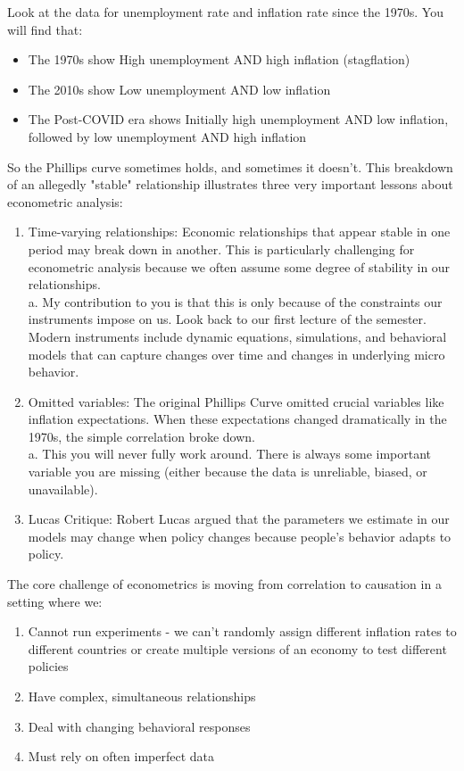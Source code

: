 \documentclass[10pt]{article}
\begin{document}
Look at the data for unemployment rate and inflation rate since the 1970s. You will find that:

\begin{itemize}
  \item The 1970s show High unemployment AND high inflation (stagflation)
  \item The 2010s show Low unemployment AND low inflation
  \item The Post-COVID era shows Initially high unemployment AND low inflation, followed by low unemployment AND high inflation
\end{itemize}

So the Phillips curve sometimes holds, and sometimes it doesn't. This breakdown of an allegedly "stable" relationship illustrates three very important lessons about econometric analysis:

\begin{enumerate}
  \item Time-varying relationships: Economic relationships that appear stable in one period may break down in another. This is particularly challenging for econometric analysis because we often assume some degree of stability in our relationships.\\
a. My contribution to you is that this is only because of the constraints our instruments impose on us. Look back to our first lecture of the semester. Modern instruments include dynamic equations, simulations, and behavioral models that can capture changes over time and changes in underlying micro behavior.
  \item Omitted variables: The original Phillips Curve omitted crucial variables like inflation expectations. When these expectations changed dramatically in the 1970s, the simple correlation broke down.\\
a. This you will never fully work around. There is always some important variable you are missing (either because the data is unreliable, biased, or unavailable).
  \item Lucas Critique: Robert Lucas argued that the parameters we estimate in our models may change when policy changes because people's behavior adapts to policy.
\end{enumerate}

The core challenge of econometrics is moving from correlation to causation in a setting where we:

\begin{enumerate}
  \item Cannot run experiments - we can't randomly assign different inflation rates to different countries or create multiple versions of an economy to test different policies
  \item Have complex, simultaneous relationships
  \item Deal with changing behavioral responses
  \item Must rely on often imperfect data
\end{enumerate}
\end{document}
